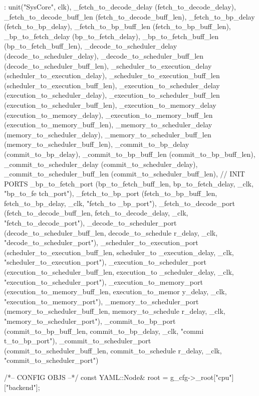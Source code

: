 \begin{DoxyCode}
        : unit("SysCore", clk),
      _fetch_to_decode_delay (fetch_to_decode_delay),
          _fetch_to_decode_buff_len (fetch_to_decode_buff_len),
          _fetch_to_bp_delay (fetch_to_bp_delay),
          _fetch_to_bp_buff_len (fetch_to_bp_buff_len),
          _bp_to_fetch_delay (bp_to_fetch_delay),
          _bp_to_fetch_buff_len (bp_to_fetch_buff_len),
          _decode_to_scheduler_delay (decode_to_scheduler_delay),
          _decode_to_scheduler_buff_len (decode_to_scheduler_buff_len),
          _scheduler_to_execution_delay (scheduler_to_execution_delay),
          _scheduler_to_execution_buff_len (scheduler_to_execution_buff_len),
          _execution_to_scheduler_delay (execution_to_scheduler_delay),
          _execution_to_scheduler_buff_len (execution_to_scheduler_buff_len),
          _execution_to_memory_delay (execution_to_memory_delay),
          _execution_to_memory_buff_len (execution_to_memory_buff_len),
          _memory_to_scheduler_delay (memory_to_scheduler_delay),
          _memory_to_scheduler_buff_len (memory_to_scheduler_buff_len),
          _commit_to_bp_delay (commit_to_bp_delay),
          _commit_to_bp_buff_len (commit_to_bp_buff_len),
          _commit_to_scheduler_delay (commit_to_scheduler_delay),
          _commit_to_scheduler_buff_len (commit_to_scheduler_buff_len),
      // INIT PORTS
      _bp_to_fetch_port (bp_to_fetch_buff_len, bp_to_fetch_delay, _clk, "bp_to_fe
      tch_port"),
      _fetch_to_bp_port (fetch_to_bp_buff_len, fetch_to_bp_delay, _clk, "fetch_to
      _bp_port"),
      _fetch_to_decode_port (fetch_to_decode_buff_len, fetch_to_decode_delay, 
      _clk, "fetch_to_decode_port"),
      _decode_to_scheduler_port (decode_to_scheduler_buff_len, decode_to_schedule
      r_delay, _clk, "decode_to_scheduler_port"),
      _scheduler_to_execution_port (scheduler_to_execution_buff_len, scheduler_to
      _execution_delay, _clk, "scheduler_to_execution_port"),
      _execution_to_scheduler_port (execution_to_scheduler_buff_len, execution_to
      _scheduler_delay, _clk, "execution_to_scheduler_port"),
      _execution_to_memory_port (execution_to_memory_buff_len, execution_to_memor
      y_delay, _clk, "execution_to_memory_port"),
      _memory_to_scheduler_port (memory_to_scheduler_buff_len, memory_to_schedule
      r_delay, _clk, "memory_to_scheduler_port"),
      _commit_to_bp_port (commit_to_bp_buff_len, commit_to_bp_delay, _clk, "commi
      t_to_bp_port"),
      _commit_to_scheduler_port (commit_to_scheduler_buff_len, commit_to_schedule
      r_delay, _clk, "commit_to_scheduler_port")
{
    /*-- CONFIG OBJS --*/
    const YAML::Node& root = g_cfg->_root["cpu"]["backend"];

}
\end{DoxyCode}
